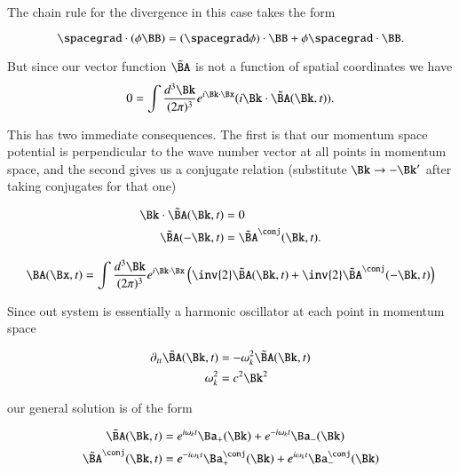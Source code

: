 The chain rule for the divergence in this case takes the form

\begin{equation}\label{eqn:relativisticElectrodynamicsL15:840}
\spacegrad \cdot (\phi \BB) = (\spacegrad \phi) \cdot \BB + \phi \spacegrad \cdot \BB.
\end{equation}

But since our vector function $\tilde{\BA}$ is not a function of spatial coordinates we have
\begin{equation}\label{eqn:relativisticElectrodynamicsL15:570}
0 = \int \frac{d^3 \Bk }{(2 \pi)^3} e^{i \Bk \cdot \Bx} (i \Bk \cdot \tilde{\BA}(\Bk, t)).
\end{equation}

This has two immediate consequences.  The first is that our momentum space potential is perpendicular to the wave number vector at all points in momentum space, and the second gives us a conjugate relation (substitute $\Bk \rightarrow -\Bk'$ after taking conjugates for that one)

\begin{align}\label{eqn:relativisticElectrodynamicsL15:590}
\Bk \cdot \tilde{\BA}(\Bk, t) &= 0 \\
\tilde{\BA}(-\Bk, t) &= \tilde{\BA}^\conj(\Bk, t).
\end{align}

\begin{equation}\label{eqn:relativisticElectrodynamicsL15:610}
\BA(\Bx, t) = \int 
\frac{d^3 \Bk}{(2\pi)^3} 
e^{i \Bk \cdot \Bx} \left( \inv{2} \tilde{\BA}(\Bk, t) + \inv{2} \tilde{\BA}^\conj(- \Bk, t) \right)
\end{equation}

Since out system is essentially a harmonic oscillator at each point in momentum space

\begin{align}\label{eqn:relativisticElectrodynamicsL15:630}
\partial_{tt} \tilde{\BA}(\Bk, t) &= - \omega_k^2 \tilde{\BA}(\Bk, t) \\
\omega_k^2 &= c^2 \Bk^2
\end{align}

our general solution is of the form

\begin{align}\label{eqn:relativisticElectrodynamicsL15:650}
\tilde{\BA}(\Bk, t) &= e^{i \omega_k t} \Ba_{+}(\Bk) +e^{-i \omega_k t} \Ba_{-}(\Bk) \\
\tilde{\BA}^\conj(\Bk, t) &= e^{-i \omega_k t} \Ba_{+}^\conj(\Bk) +e^{i \omega_k t} \Ba_{-}^\conj(\Bk)
\end{align}

